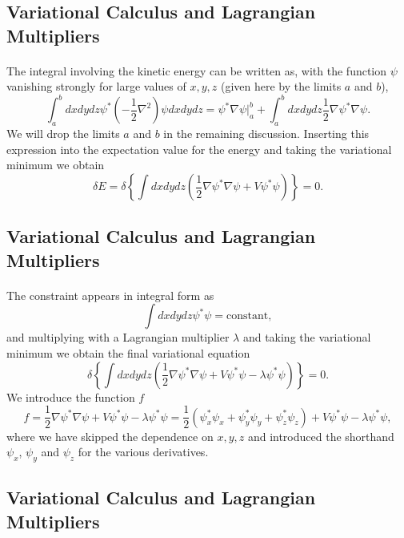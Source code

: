 \documentclass[%
twoside,                 %
final,                   %
10pt]{article}
\begin{document}
\subsection*{Variational Calculus and Lagrangian Multipliers}

\paragraph{}
The integral involving the kinetic energy can be written as, with the function $\psi$ vanishing
strongly for large values of $x,y,z$ (given here by the limits $a$ and $b$), 
 \[
  \int_a^b dxdydz \psi^* \left(-\frac{1}{2}\nabla^2\right) \psi dxdydz = \psi^*\nabla\psi|_a^b+\int_a^b dxdydz\frac{1}{2}\nabla\psi^*\nabla\psi.
\]
We will drop the limits $a$ and $b$ in the remaining discussion. 
Inserting this expression into the expectation value for the energy and taking the variational minimum  we obtain
\[
\delta E = \delta \left\{\int dxdydz\left( \frac{1}{2}\nabla\psi^*\nabla\psi+V\psi^*\psi\right)\right\} = 0.
\]



\subsection*{Variational Calculus and Lagrangian Multipliers}

\paragraph{}
The constraint appears in integral form as 
\[
 \int dxdydz \psi^* \psi=\mathrm{constant},
\]
and multiplying with a Lagrangian multiplier $\lambda$ and taking the variational minimum we obtain the final variational equation
\[
\delta \left\{\int dxdydz\left( \frac{1}{2}\nabla\psi^*\nabla\psi+V\psi^*\psi-\lambda\psi^*\psi\right)\right\} = 0.
\]
We introduce the function  $f$
\[
  f =  \frac{1}{2}\nabla\psi^*\nabla\psi+V\psi^*\psi-\lambda\psi^*\psi=
\frac{1}{2}(\psi^*_x\psi_x+\psi^*_y\psi_y+\psi^*_z\psi_z)+V\psi^*\psi-\lambda\psi^*\psi,
\]
where we have skipped the dependence on $x,y,z$ and introduced the shorthand $\psi_x$, $\psi_y$ and $\psi_z$  for the various derivatives.



\subsection*{Variational Calculus and Lagrangian Multipliers}
\end{document}
